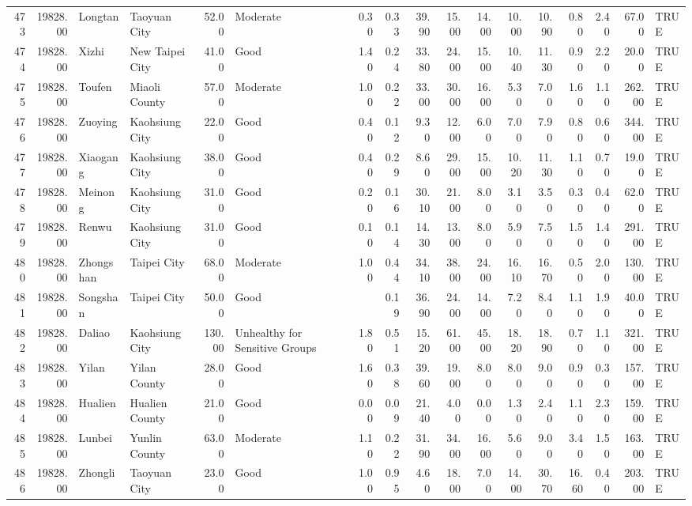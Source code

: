 \begin{table}[ht]
\begin{tabular}{rrllrlrrrrrrrrrrl}
  473 & 19828.00 & Longtan & Taoyuan City & 52.00 & Moderate & 0.30 & 0.33 & 39.90 & 15.00 & 14.00 & 10.00 & 10.90 & 0.80 & 2.40 & 67.00 & TRUE \\ 
  474 & 19828.00 & Xizhi & New Taipei City & 41.00 & Good & 1.40 & 0.24 & 33.80 & 24.00 & 15.00 & 10.40 & 11.30 & 0.90 & 2.20 & 20.00 & TRUE \\ 
  475 & 19828.00 & Toufen & Miaoli County & 57.00 & Moderate & 1.00 & 0.22 & 33.00 & 30.00 & 16.00 & 5.30 & 7.00 & 1.60 & 1.10 & 262.00 & TRUE \\ 
  476 & 19828.00 & Zuoying & Kaohsiung City & 22.00 & Good & 0.40 & 0.12 & 9.30 & 12.00 & 6.00 & 7.00 & 7.90 & 0.80 & 0.60 & 344.00 & TRUE \\ 
  477 & 19828.00 & Xiaogang & Kaohsiung City & 38.00 & Good & 0.40 & 0.29 & 8.60 & 29.00 & 15.00 & 10.20 & 11.30 & 1.10 & 0.70 & 19.00 & TRUE \\ 
  478 & 19828.00 & Meinong & Kaohsiung City & 31.00 & Good & 0.20 & 0.16 & 30.10 & 21.00 & 8.00 & 3.10 & 3.50 & 0.30 & 0.40 & 62.00 & TRUE \\ 
  479 & 19828.00 & Renwu & Kaohsiung City & 31.00 & Good & 0.10 & 0.14 & 14.30 & 13.00 & 8.00 & 5.90 & 7.50 & 1.50 & 1.40 & 291.00 & TRUE \\ 
  480 & 19828.00 & Zhongshan & Taipei City & 68.00 & Moderate & 1.00 & 0.44 & 34.10 & 38.00 & 24.00 & 16.10 & 16.70 & 0.50 & 2.00 & 130.00 & TRUE \\ 
  481 & 19828.00 & Songshan & Taipei City & 50.00 & Good &  & 0.19 & 36.90 & 24.00 & 14.00 & 7.20 & 8.40 & 1.10 & 1.90 & 40.00 & TRUE \\ 
  482 & 19828.00 & Daliao & Kaohsiung City & 130.00 & Unhealthy for Sensitive Groups & 1.80 & 0.51 & 15.20 & 61.00 & 45.00 & 18.20 & 18.90 & 0.70 & 1.10 & 321.00 & TRUE \\ 
  483 & 19828.00 & Yilan & Yilan County & 28.00 & Good & 1.60 & 0.38 & 39.60 & 19.00 & 8.00 & 8.00 & 9.00 & 0.90 & 0.30 & 157.00 & TRUE \\ 
  484 & 19828.00 & Hualien & Hualien County & 21.00 & Good & 0.00 & 0.09 & 21.40 & 4.00 & 0.00 & 1.30 & 2.40 & 1.10 & 2.30 & 159.00 & TRUE \\ 
  485 & 19828.00 & Lunbei & Yunlin County & 63.00 & Moderate & 1.10 & 0.22 & 31.90 & 34.00 & 16.00 & 5.60 & 9.00 & 3.40 & 1.50 & 163.00 & TRUE \\ 
  486 & 19828.00 & Zhongli & Taoyuan City & 23.00 & Good & 1.00 & 0.95 & 4.60 & 18.00 & 7.00 & 14.00 & 30.70 & 16.60 & 0.40 & 203.00 & TRUE \\ 

\end{tabular}
\end{table}
